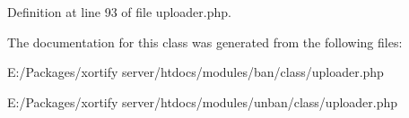 Definition at line 93 of file uploader.\-php.



The documentation for this class was generated from the following files\-:\begin{DoxyCompactItemize}
\item 
E\-:/\-Packages/xortify server/htdocs/modules/ban/class/uploader.\-php\item 
E\-:/\-Packages/xortify server/htdocs/modules/unban/class/uploader.\-php\end{DoxyCompactItemize}
